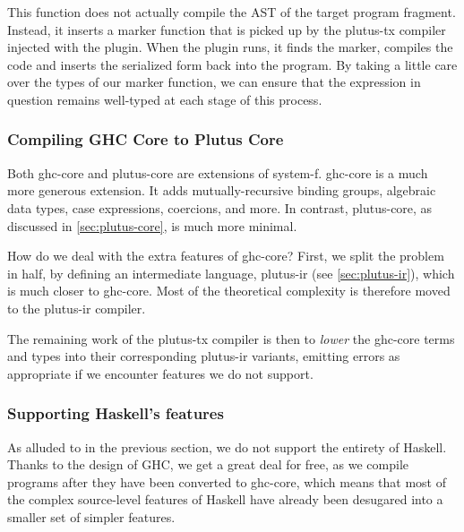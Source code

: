 This function does not actually compile the AST of the target program fragment.
Instead, it inserts a marker function that is picked up by the \gls{plutus-tx} compiler injected with the plugin.
When the plugin runs, it finds the marker, compiles the code and inserts the serialized form back into the program.
By taking a little care over the types of our marker function, we can ensure that the expression in question remains well-typed at each stage of this process.

\subsubsection{Compiling GHC Core to Plutus Core}

Both \gls{ghc-core} and \gls{plutus-core} are extensions of \gls{system-f}.
\Gls{ghc-core} is a much more generous extension.
It adds mutually-recursive binding groups, algebraic data types, case expressions, coercions, and more.
In contrast, \gls{plutus-core}, as discussed in \cref{sec:plutus-core}, is much more minimal.

How do we deal with the extra features of \gls{ghc-core}?
First, we split the problem in half, by defining an intermediate language, \gls{plutus-ir} (see \cref{sec:plutus-ir}), which is much closer to \gls{ghc-core}.
Most of the theoretical complexity is therefore moved to the \gls{plutus-ir} compiler.

The remaining work of the \gls{plutus-tx} compiler is then to \emph{lower} the \gls{ghc-core} terms and types into their corresponding \gls{plutus-ir} variants, emitting errors as appropriate if we encounter features we do not support.

\subsubsection{Supporting Haskell's features}

As alluded to in the previous section, we do not support the entirety of Haskell.
Thanks to the design of GHC, we get a great deal for free, as we compile programs after they have been converted to \gls{ghc-core}, which means that most of the complex source-level features of Haskell have already been desugared into a smaller set of simpler features.

